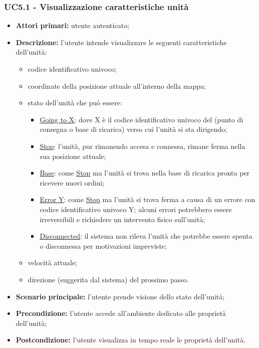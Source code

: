         \subsubsection{UC5.1 - Visualizzazione caratteristiche unità}
        \begin{itemize}
            \item \textbf{Attori primari:} utente autenticato;
            \item \textbf{Descrizione:} l'utente intende visualizzare le seguenti caratteristiche dell'unità:
            \begin{itemize}
                \item codice identificativo univoco;
                \item coordinate della posizione attuale all'interno della mappa;
                \item stato dell'unità che può essere:
                \begin{itemize}
                    \item \underline{Going to X}: dove X è il codice identificativo univoco del  (punto di consegna o base di ricarica) verso cui l'unità si sta dirigendo;
                    \item \underline{Stop}: l'unità, pur rimanendo accesa e connessa, rimane ferma nella sua posizione attuale;
                    \item \underline{Base}: come \underline{Stop} ma l'unità si trova nella base di ricarica pronta per ricevere nuovi ordini;
                    \item \underline{Error Y}: come \underline{Stop} ma l'unità si trova ferma a causa di un errore con codice identificativo univoco Y; alcuni errori potrebbero essere irreversibili e richiedere un intervento fisico sull'unità;
                    \item \underline{Disconnected}: il sistema non rileva l'unità che potrebbe essere spenta o disconnessa per motivazioni impreviste;
                \end{itemize}
                \item velocità attuale;
                \item direzione (suggerita dal sistema) del prossimo passo.
            \end{itemize}
            \item \textbf{Scenario principale:} l'utente prende visione dello stato dell'unità;
            \item \textbf{Precondizione:} l'utente accede all'ambiente dedicato alle proprietà dell'unità;
            \item \textbf{Postcondizione:} l'utente visualizza in tempo reale le proprietà dell'unità.
        \end{itemize}

